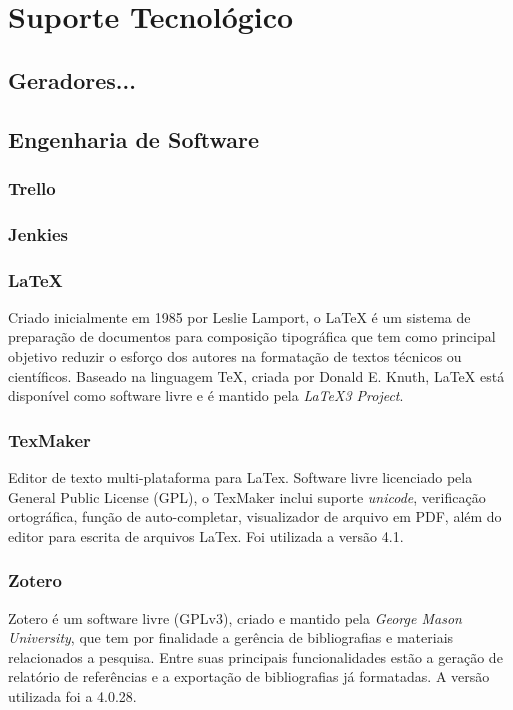 \chapter[Suporte Tecnologico]{Suporte Tecnológico}

\section{Geradores...}

\section{Engenharia de Software}


\subsection{Trello} 
\subsection{Jenkies}
\subsection{LaTeX}
Criado inicialmente em 1985 por Leslie Lamport, o LaTeX é um sistema de preparação de documentos para composição tipográfica que tem como principal objetivo reduzir o esforço dos autores na formatação de textos técnicos ou científicos. Baseado na linguagem TeX, criada por Donald E. Knuth, LaTeX está disponível como software livre e é mantido pela \textit{LaTeX3 Project}.

\subsection{TexMaker}
Editor de texto multi-plataforma para LaTex. Software livre licenciado pela General Public License (GPL), o TexMaker inclui suporte \textit{unicode}, verificação ortográfica, função de auto-completar, visualizador de arquivo em PDF, além do editor para escrita de arquivos LaTex. Foi utilizada a versão 4.1.

\subsection{Zotero}
Zotero é um software livre (GPLv3), criado e mantido pela \textit{George Mason University}, que tem por finalidade a gerência de bibliografias e materiais relacionados a pesquisa. Entre suas principais funcionalidades estão a geração de relatório de referências e a exportação de bibliografias já formatadas. A versão utilizada foi a 4.0.28.

